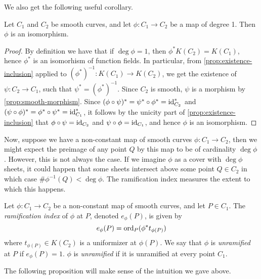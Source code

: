 We also get the following useful corollary.
\begin{corollary}
	\label{cor:deg-1-isom}
	Let $C_1$ and $C_2$ be smooth curves, and let $\phi: C_1 \to C_2$
	be a map of degree 1. Then $\phi$ is an isomorphism.
\end{corollary}

\begin{proof}
	By definition we have that if $\deg \phi = 1$, then $\phi^*K(C_2) = K(C_1)$,
	hence $\phi^*$ is an isomorhism of function fields.
	In particular, from \ref{prop:existence-inclusion} applied to
	$(\phi^*)^{-1}: K(C_1) \to K(C_2)$, we get the existence
	of $\psi: C_2 \to C_1$, such that $\psi^* = (\phi^*)^{-1}$.
	Since $C_2$ is smooth, $\psi$ is a morphism by \ref{prop:smooth-morphism}.
	Since $(\phi \circ \psi)^* = \psi^* \circ \phi^* = \operatorname{id}_{C_2}^*$
	and $(\psi\circ \phi)^* = \phi^* \circ \psi^* = \operatorname{id}_{C_1}^*$,
	it follows by the unicity part of \ref{prop:existence-inclusion}
	that $\phi\circ\psi = \operatorname{id}_{C_2}$ and $\psi\circ\phi = \operatorname{id}_{C_1}$, and
	hence $\phi$ is an isomorphism.
\end{proof}


Now, suppose we have a non-constant map of smooth curves
$\phi: C_1 \to C_2$, then we might expect the preimage of any point $Q$
by this map to be of cardinality $\deg\phi$. However, this is not always
the case. If we imagine $\phi$ as a cover with $\deg\phi$ sheets,
it could happen that some sheets intersect above some point
$Q \in C_2$ in which case $\#\phi^{-1}(Q) < \deg\phi$.
The ramification index measures the extent to which this happens.

\begin{definition}
	Let $\phi: C_1 \to C_2$ be a non-constant map of smooth curves, and let
	$P \in C_1$. The \emph{ramification index} of $\phi$ at $P$, denoted
	$e_\phi(P)$, is given by
	\begin{equation*}
		e_\phi(P) = \operatorname{ord}_P(\phi^*t_{\phi(P)})
	\end{equation*}
	where $t_{\phi(P)} \in K(C_2)$ is a uniformizer at $\phi(P)$.
	We say that $\phi$ is \emph{unramified} at $P$ if $e_\phi(P) = 1$. $\phi$ is
	\emph{unramified} if it is unramified at every point $C_1$.
\end{definition}

The following proposition will make sense of the intuition we gave above.

